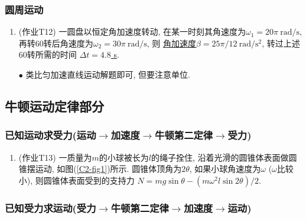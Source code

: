 \subsubsection{圆周运动}

\begin{enumerate}
	\item (作业T12) 一圆盘以恒定角加速度转动, 在某一时刻其角速度为$\omega_1 = 20 \pi \mathrm{~rad}/\mathrm{s}$, 再转60转后角速度为$\omega_2 = 30 \pi \mathrm{~rad}/\mathrm{s}$, 则 \uline{角加速度$\beta = 25\pi/12 \mathrm{~rad}/\mathrm{s}^2$}, 转过上述60转所需的时间 \uline{$\Delta t = 4.8$ s}. 
	
	\vskip 0.1cm
	
	\begin{note}
		$\bullet$ 类比匀加速直线运动解题即可, 但要注意单位. 
	\end{note}
	
\end{enumerate}

\subsection{牛顿运动定律部分}

\subsubsection{已知运动求受力(运动$\rightarrow$加速度$\rightarrow$牛顿第二定律$\rightarrow$受力)}

\begin{enumerate}
	
	\item (作业T13) 一质量为$m$的小球被长为$l$的绳子拴住, 沿着光滑的圆锥体表面做圆锥摆运动, 如图(\ref{C2-fig1})所示. 圆锥体顶角为$2\theta$, 如果小球角速度为$\omega$ ($\omega$比较小), 则圆锥体表面受到的支持力 \uline{$N = mg\sin \theta - (m \omega^2 l \sin 2 \theta) / 2$}. 
	
\end{enumerate}

\subsubsection{已知受力求运动(受力$\rightarrow$牛顿第二定律$\rightarrow$加速度$\rightarrow$运动)}

